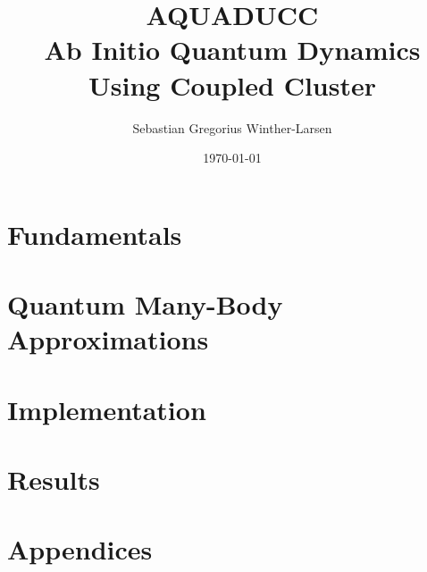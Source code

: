 \documentclass[twoside, english, notitlepage, 10pt]{uiofysmaster}
\author{Sebastian Gregorius Winther-Larsen}
\title{\textbf{AQUADUCC} \\ 
    {\Large 
    \textbf{A}b Initio \textbf{Qua}ntum 
    \textbf{D}ynamics \textbf{U}sing 
    \textbf{C}oupled \textbf{C}luster
    }
}
\date{\today}
\begin{document}
\frontmatter
    \maketitle

    \tableofcontents

\mainmatter

    \part{Fundamentals}

        
        

    \part{Quantum Many-Body Approximations}

        
        
        

    \part{Implementation}

        
         
    
    \part{Results}
        
        
        

    \part{Appendices}
    \appendix

        
        
        
        

    \printbibliography
\end{document}
